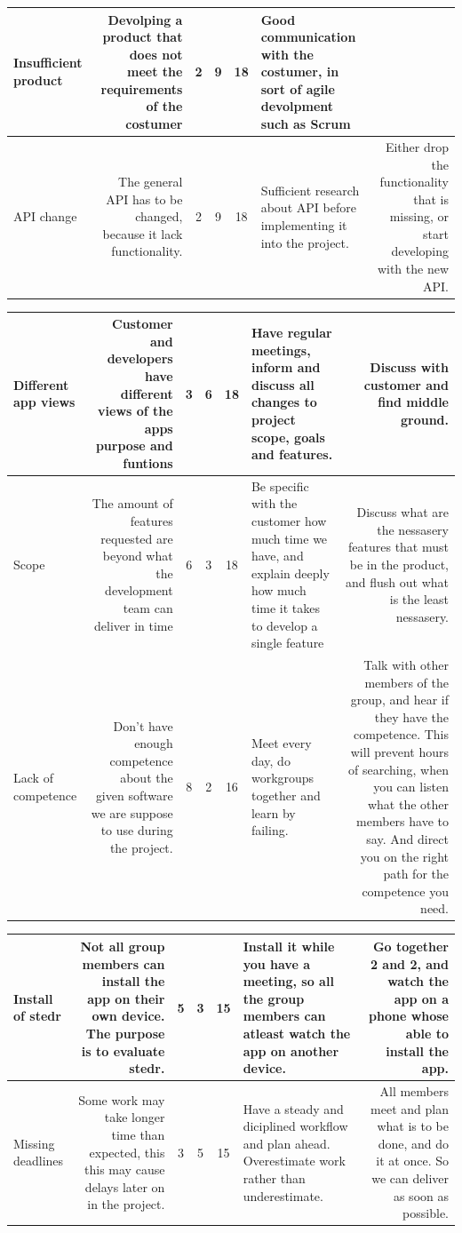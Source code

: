 \documentclass[12pt,a4paper,titlepage]{article}
\begin{document}
\begin{center}
\begin{tabulary}{\textwidth}{LRCCCLR}
\hline
Insufficient product & Devolping a product that does not meet the requirements of the costumer & 2 & 9 & 18 & Good communication with the costumer, in sort of agile devolpment such as Scrum & \\ 
\hline
API change & The general API has to be changed, because it lack functionality. & 2 & 9 & 18 & Sufficient research about API before implementing it into the project. & Either drop the functionality that is missing, or start developing with the new API.\\ 
\hline
						\end{tabulary}
						\begin{tabulary}{\textwidth}{LRCCCLR} \toprule
Different app views & Customer and developers have different views of the apps purpose and funtions & 3 & 6 & 18 & Have regular meetings, inform and discuss all changes to project scope, goals and features. & Discuss with customer and find middle ground.\\ 
\hline
Scope & The amount of features requested are beyond what the development team can deliver in time & 6 & 3 & 18 & Be specific with the customer how much time we have, and explain deeply how much time it takes to develop a single feature & Discuss what are the nessasery features that must be in the product, and flush out what is the least nessasery.\\ 
\hline
Lack of competence & Don't have enough competence about the given software we are suppose to use during the project. & 8 & 2 & 16 & Meet every day, do workgroups together and learn by failing. & Talk with other members of the group, and hear if they have the competence. This will prevent hours of searching, when you can listen what the other members have to say. And direct you on the right path for the competence you need.\\ 
\hline
						\end{tabulary}
						\begin{tabulary}{\textwidth}{LRCCCLR} \toprule
Install of stedr & Not all group members can install the app on their own device. The purpose is to evaluate stedr. & 5 & 3 & 15 & Install it while you have a meeting, so all the group members can atleast watch the app on another device. & Go together 2 and 2, and watch the app on a phone whose able to install the app.\\ 
\hline
Missing deadlines & Some work may take longer time than expected, this this may cause delays later on in the project. & 3 & 5 & 15 & Have a steady and diciplined workflow and plan ahead. Overestimate work rather than underestimate. & All members meet and plan what is to be done, and do it at once. So we can deliver as soon as possible.\\ 

\end{tabulary}
\end{center}
\end{document}
